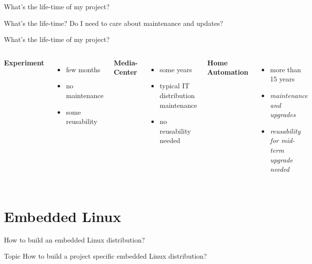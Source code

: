 \documentclass{beamer}
\begin{document}
\begin{frame}{What's the life-time of my project?}
	\begin{block}{What's the life-time?}
		Do I need to care about maintenance and updates?
	\end{block}
\end{frame}

\begin{frame}{What's the life-time of my project?}
	\begin{columns}[t]
        \centering
        \textbf{Experiment}
        \begin{itemize}
        		\item few months
        		\item no maintenance
        		\item some reusability
        \end{itemize}
        \centering
        \textbf{Media-Center}
        \begin{itemize}
        		\item some years
        		\item typical IT distribution maintenance
        		\item no reusability needed
        \end{itemize}
        \centering
        \textbf{Home Automation}
        \begin{itemize}
        		\item more than 15 years
        		\item \emph{maintenance and upgrades}
        		\item \emph{reusability for mid-term upgrade needed}
        \end{itemize}
    \end{columns}
\end{frame}

\section{Embedded Linux}

\begin{frame}{How to build an embedded Linux distribution?}
	\begin{block}{Topic}
		How to build a project specific embedded Linux distribution?
	\end{block}
\end{frame}
\end{document}
